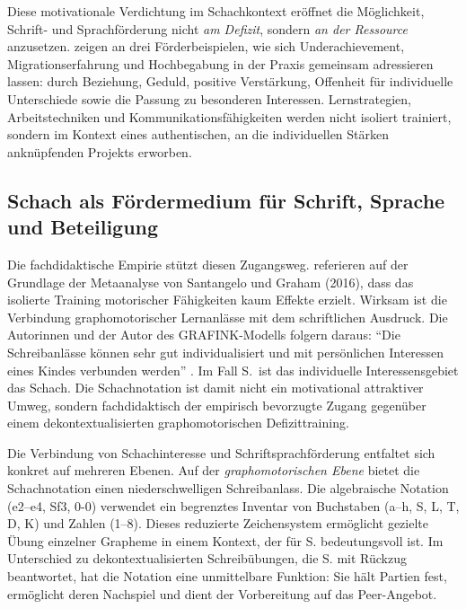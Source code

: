 \documentclass[ngerman, a4paper]{article}
\begin{document}
Diese motivationale Verdichtung im Schachkontext eröffnet die Möglichkeit, Schrift-
und Sprachförderung nicht \textit{am Defizit}, sondern \textit{an der Ressource} anzusetzen.
\textcite[S.\,247--252]{warneckehauke2020bildungsgerechtigkeit}
zeigen an drei Förderbeispielen, wie sich Underachievement, Migrationserfahrung
und Hochbegabung in der Praxis gemeinsam adressieren lassen: durch Beziehung,
Geduld, positive Verstärkung, Offenheit für individuelle Unterschiede sowie
die Passung zu besonderen Interessen. Lernstrategien, Arbeitstechniken
und Kommunikationsfähigkeiten werden nicht isoliert trainiert, sondern im
Kontext eines authentischen, an die individuellen Stärken anknüpfenden
Projekts erworben.

\subsection{Schach als Fördermedium für Schrift, Sprache und Beteiligung}

Die fachdidaktische Empirie stützt diesen Zugangsweg.
\textcite[S.\,6]{saegesserwyss2021grafinkrahmenmodell} referieren auf der Grundlage
der Metaanalyse von Santangelo und Graham (2016), dass das isolierte Training
motorischer Fähigkeiten kaum Effekte erzielt. Wirksam ist die Verbindung
graphomotorischer Lernanlässe mit dem schriftlichen Ausdruck. Die Autorinnen und
der Autor des GRAFINK-Modells folgern daraus: \enquote{Die Schreibanlässe können
  sehr gut individualisiert und mit persönlichen Interessen eines Kindes verbunden
  werden} \parencite[S.\,6]{saegesserwyss2021grafinkrahmenmodell}. Im Fall S.\ ist
das individuelle Interessensgebiet das Schach. Die Schachnotation ist damit nicht
ein motivational attraktiver Umweg, sondern fachdidaktisch der empirisch
bevorzugte Zugang gegenüber einem dekontextualisierten graphomotorischen
Defizittraining.

Die Verbindung von Schachinteresse und Schriftsprachförderung entfaltet sich
konkret auf mehreren Ebenen. Auf der \textit{graphomotorischen Ebene} bietet die
Schachnotation einen niederschwelligen Schreibanlass.
Die algebraische Notation (e2--e4, Sf3, 0-0)
verwendet ein begrenztes Inventar von Buchstaben (a--h, S, L, T, D, K) und Zahlen
(1--8). Dieses reduzierte Zeichensystem ermöglicht gezielte Übung einzelner Grapheme
in einem Kontext, der für S. bedeutungsvoll ist. Im Unterschied zu dekontextualisierten
Schreibübungen, die S. mit Rückzug beantwortet, hat die Notation eine unmittelbare
Funktion: Sie hält Partien fest, ermöglicht deren Nachspiel und dient der Vorbereitung
auf das Peer-Angebot.
\end{document}
